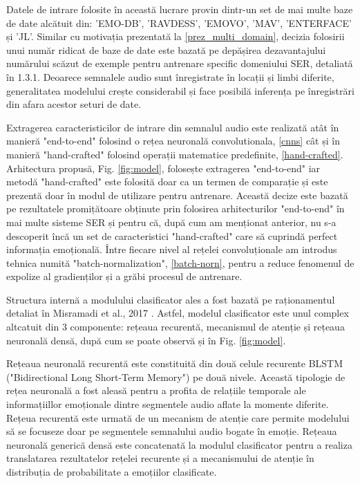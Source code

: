 \documentclass[a4paper,12pt]{book}
\begin{document}
					Datele de intrare folosite în această lucrare provin dintr-un set de mai multe baze de date alcătuit din: 'EMO-DB', 'RAVDESS', 'EMOVO', 'MAV', 'ENTERFACE' și 'JL'. Similar cu motivația prezentată la \ref{prez_multi_domain}, decizia folosirii unui număr ridicat de baze de date este bazată pe depășirea dezavantajului numărului scăzut de exemple pentru antrenare specific domeniului SER, detaliată în 1.3.1. Deoarece semnalele audio sunt înregistrate în locații și limbi diferite, generalitatea modelului crește considerabil și face posibilă inferența pe înregistrări din afara acestor seturi de date. \par
					
					Extragerea caracteristicilor de intrare din semnalul audio este realizată atât în manieră "end-to-end" folosind o rețea neuronală convolutionala, \ref{cnns} cât și în manieră "hand-crafted" folosind operații matematice predefinite, \ref{hand-crafted}. Arhitectura propusă, Fig. \ref{fig:model}, folosește extragerea "end-to-end" iar metodă "hand-crafted" este folosită doar ca un termen de comparație și este prezentă doar în modul de utilizare pentru antrenare. Această decize este bazată pe rezultatele promițătoare obținute prin folosirea arhitecturilor "end-to-end"  în mai multe sisteme SER și pentru că, după cum am menționat anterior, nu s-a descoperit încă un set de caracteristici "hand-crafted" care să cuprindă perfect informația emoțională. Între fiecare nivel al rețelei convoluționale am introdus tehnica numită "batch-normalization", \ref{batch-norn}, pentru a reduce fenomenul de expolize al gradienților și a grăbi procesul de antrenare. \par
					Structura internă a modulului clasificator ales a fost bazată pe raționamentul detaliat în Misramadi et al., 2017 \cite{misramadi}. Astfel, modelul clasificator este unul complex altcatuit din 3 componente: rețeaua recurentă, mecanismul de atenție și rețeaua neuronală densă, după cum se poate observă și în Fig. \ref{fig:model}.   \par
					Rețeaua neuronală recurentă este constituită din două celule recurente BLSTM ("Bidirectional Long Short-Term Memory") pe două nivele. Această tipologie de rețea neuronală a fost aleasă pentru a profita de relațiile temporale ale informațiillor emoționale dintre segmentele audio aflate la momente diferite. Rețeua recurentă este urmată de un mecanism de atenție care permite modelului să se focuseze doar pe segmentele semnalului audio bogate în emoție. Rețeaua neuronală generică densă este concatenată la modulul clasificator pentru a realiza translatarea rezultatelor rețelei recurente și a mecanismului de atenție în distribuția de probabilitate a emoțiilor clasificate.\par
					
\end{document}
